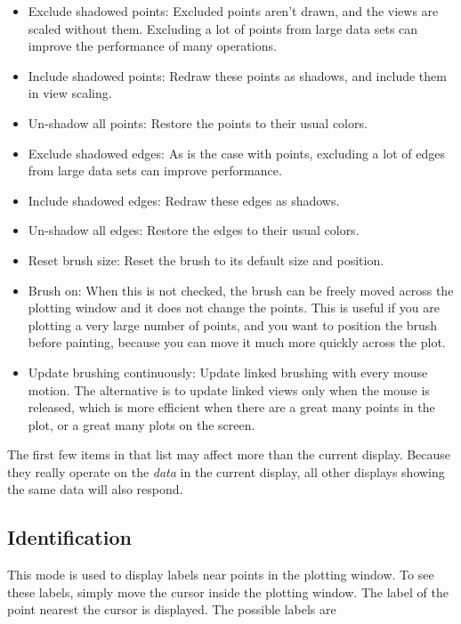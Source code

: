 \documentclass[11pt]{article}
\begin{document}
\begin{itemize}
 \item Exclude shadowed points: Excluded points
       aren't drawn, and the views are scaled without them.  Excluding
       a lot of points from large data sets can improve the performance
       of many operations.
 \item Include shadowed points: Redraw these points
       as shadows, and include them in view scaling.
 \item Un-shadow all points: Restore the points to their usual colors.
 \item Exclude shadowed edges: As is the case with
       points, excluding a lot of edges from large data sets can
       improve performance.
 \item Include shadowed edges: Redraw these edges as shadows.
 \item Un-shadow all edges: Restore the edges to their usual colors.
 \item Reset brush size: Reset the brush to its default size and position.
 \item Brush on: When this is not checked, the brush can be freely
    moved across the plotting window and it does not change the points.
    This is useful if you are plotting a very large number of points,
    and you want to position the brush before painting, because you
    can move it much more quickly across the plot.  
 \item Update brushing continuously: Update linked brushing with every
    mouse motion.  The alternative is to update linked views only when
    the mouse is released, which is more efficient when there are a
    great many points in the plot, or a great many plots on the
    screen.
\end{itemize}

The first few items in that list may affect more than the current
display.  Because they really operate on the {\em data} in the current
display, all other displays showing the same data will also respond.

\subsection{Identification}
\label{slbl:Identify}

This mode is used to display labels near points in the plotting window.
To see these labels, simply move the cursor inside the plotting window.
The label of the point nearest the cursor is displayed.  The possible
labels are
\end{document}
